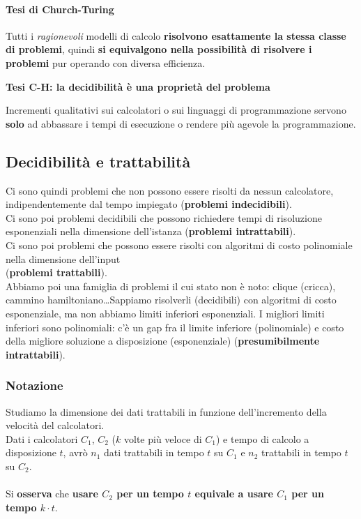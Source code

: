 \documentclass[10pt]{book}
\begin{document}
\paragraph{Tesi di Church-Turing} Tutti i \textit{ragionevoli} modelli di calcolo \textbf{risolvono esattamente la stessa classe di problemi}, quindi \textbf{si equivalgono nella possibilità di risolvere i problemi} pur operando con diversa efficienza.
\begin{center}
\textbf{Tesi C-H: la decidibilità è una proprietà del problema}
\end{center}
Incrementi qualitativi sui calcolatori o sui linguaggi di programmazione servono \textbf{solo} ad abbassare i tempi di esecuzione o rendere più agevole la programmazione.
\subsection{Decidibilità e trattabilità}
Ci sono quindi problemi che non possono essere risolti da nessun calcolatore, indipendentemente dal tempo impiegato (\textbf{problemi indecidibili}).\\
Ci sono poi problemi decidibili che possono richiedere tempi di risoluzione esponenziali nella dimensione dell'istanza (\textbf{problemi intrattabili}).\\
Ci sono poi problemi che possono essere risolti con algoritmi di costo polinomiale nella dimensione dell'input\\(\textbf{problemi trattabili}).\\
Abbiamo poi una famiglia di problemi il cui stato non è noto: clique (cricca), cammino hamiltoniano\ldots Sappiamo risolverli (decidibili) con algoritmi di costo esponenziale, ma non abbiamo limiti inferiori esponenziali. I migliori limiti inferiori sono polinomiali: c'è un gap fra il limite inferiore (polinomiale) e costo della migliore soluzione a disposizione (esponenziale) (\textbf{presumibilmente intrattabili}).
\subsubsection{Notazione}
Studiamo la dimensione dei dati trattabili in funzione dell'incremento della velocità del calcolatori.\\
Dati i calcolatori $C_1$, $C_2$ ($k$ volte più veloce di $C_1$) e tempo di calcolo a disposizione $t$, avrò $n_1$ dati trattabili in tempo $t$ su $C_1$ e $n_2$ trattabili in tempo $t$ su $C_2$.\\\\
Si \textbf{osserva} che \textbf{usare $C_2$ per un tempo $t$ equivale a usare $C_1$ per un tempo $k\cdot t$}.
\end{document}
